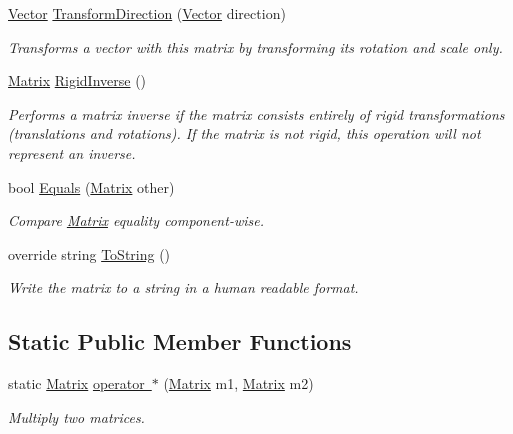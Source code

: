 \begin{DoxyCompactItemize}
\mbox{\hyperlink{struct_leap_1_1_vector}{Vector}} \mbox{\hyperlink{struct_leap_1_1_matrix_a64110864a06e02eb50977596633d39a6}{Transform\+Direction}} (\mbox{\hyperlink{struct_leap_1_1_vector}{Vector}} direction)
\begin{DoxyCompactList}\small\item\em Transforms a vector with this matrix by transforming its rotation and scale only. \end{DoxyCompactList}\item 
\mbox{\hyperlink{struct_leap_1_1_matrix}{Matrix}} \mbox{\hyperlink{struct_leap_1_1_matrix_a5871fb349967846eab0d702d54d32ead}{Rigid\+Inverse}} ()
\begin{DoxyCompactList}\small\item\em Performs a matrix inverse if the matrix consists entirely of rigid transformations (translations and rotations). If the matrix is not rigid, this operation will not represent an inverse. \end{DoxyCompactList}\item 
bool \mbox{\hyperlink{struct_leap_1_1_matrix_a304a036cbf1b9389e6566ae2820337b9}{Equals}} (\mbox{\hyperlink{struct_leap_1_1_matrix}{Matrix}} other)
\begin{DoxyCompactList}\small\item\em Compare \mbox{\hyperlink{struct_leap_1_1_matrix}{Matrix}} equality component-\/wise. \end{DoxyCompactList}\item 
override string \mbox{\hyperlink{struct_leap_1_1_matrix_acfd1fe19641c592fa4ae31c827a4a0f0}{To\+String}} ()
\begin{DoxyCompactList}\small\item\em Write the matrix to a string in a human readable format. \end{DoxyCompactList}\end{DoxyCompactItemize}
\subsection*{Static Public Member Functions}
\begin{DoxyCompactItemize}
\item 
static \mbox{\hyperlink{struct_leap_1_1_matrix}{Matrix}} \mbox{\hyperlink{struct_leap_1_1_matrix_a9229388e085ffc3a95a2f3236b4d8ff8}{operator $\ast$}} (\mbox{\hyperlink{struct_leap_1_1_matrix}{Matrix}} m1, \mbox{\hyperlink{struct_leap_1_1_matrix}{Matrix}} m2)
\begin{DoxyCompactList}\small\item\em Multiply two matrices. \end{DoxyCompactList}\end{DoxyCompactItemize}
